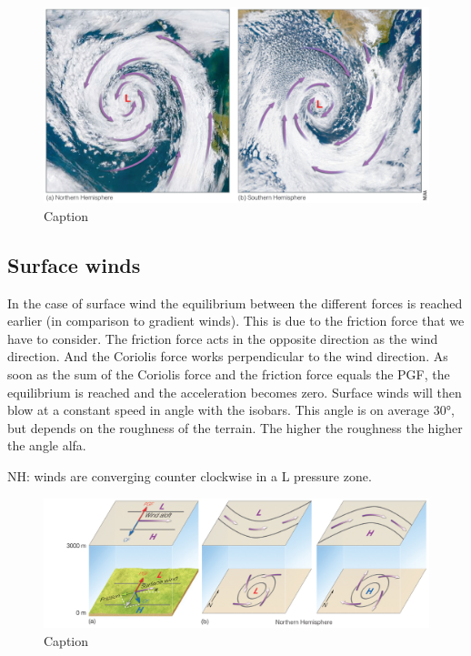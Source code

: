 \documentclass[12pt,oneside]{book}
\begin{document}
\begin{figure}

{\centering \includegraphics[width=0.8\linewidth]{figures/Figure412} 

}

\caption{Caption}\label{fig:NHSH}
\end{figure}

\subsection{Surface winds}\label{surface-winds}

In the case of surface wind the equilibrium between the different forces
is reached earlier (in comparison to gradient winds). This is due to the
friction force that we have to consider. The friction force acts in the
opposite direction as the wind direction. And the Coriolis force works
perpendicular to the wind direction. As soon as the sum of the Coriolis
force and the friction force equals the PGF, the equilibrium is reached
and the acceleration becomes zero. Surface winds will then blow at a
constant speed in angle with the isobars. This angle is on average 30°,
but depends on the roughness of the terrain. The higher the roughness
the higher the angle alfa.

NH: winds are converging counter clockwise in a L pressure zone.

\begin{figure}

{\centering \includegraphics[width=0.8\linewidth]{figures/Figure413} 

}

\caption{Caption}\label{fig:CW}
\end{figure}
\end{document}
